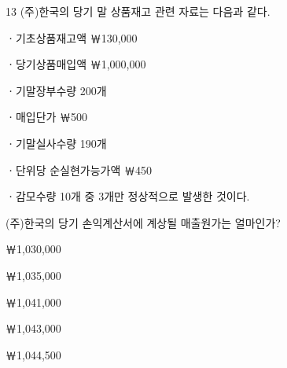 \begin{question}{13}
(주)한국의 당기 말 상품재고 관련 자료는 다음과 같다.
\begin{framedtext}
ㆍ기초상품재고액 ￦130,000 \par
ㆍ당기상품매입액 ￦1,000,000 \par
ㆍ기말장부수량 200개 \par
ㆍ매입단가 ￦500 \par
ㆍ기말실사수량 190개 \par
ㆍ단위당 순실현가능가액 ￦450 \par
ㆍ감모수량 10개 중 3개만 정상적으로 발생한 것이다. \par
\end{framedtext}
(주)한국의 당기 손익계산서에 계상될 매출원가는 얼마인가? \par
\begin{choices}
  \item ￦1,030,000
  \item ￦1,035,000
  \item ￦1,041,000
  \item ￦1,043,000
  \item ￦1,044,500
\end{choices}
\end{question}
